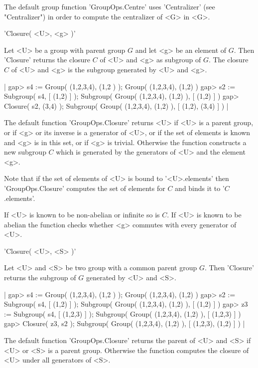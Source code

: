 The default   group function   'GroupOps.Centre' uses  'Centralizer' (see
"Centralizer") in order to compute the centralizer of <G> in <G>.


'Closure( <U>, <g> )'

Let <U> be  a group with  parent group $G$  and let <g> be an  element of
$G$. Then 'Closure' returns the closure $C$ of <U> and <g> as subgroup of
$G$. The closure $C$ of <U> and <g> is  the subgroup generated by <U> and
<g>.

|    gap> s4 := Group( (1,2,3,4), (1,2 ) );
    Group( (1,2,3,4), (1,2) )
    gap> s2 := Subgroup( s4, [ (1,2) ] );
    Subgroup( Group( (1,2,3,4), (1,2) ), [ (1,2) ] )
    gap> Closure( s2, (3,4) );
    Subgroup( Group( (1,2,3,4), (1,2) ), [ (1,2), (3,4) ] ) |

The default function 'GroupOps.Closure'  returns <U> if <U> is  a  parent
group, or if <g> or its inverse  is a generator of  <U>, or if the set of
elements  is  known  and  <g>  is in  this  set,  or  if <g>  is trivial.
Otherwise the function constructs a  new subgroup $C$  which is generated
by the generators of <U> and the element <g>.

Note  that if the set of elements of <U> is bound to '<U>.elements'  then
'GroupOps.Closure'  computes the set of elements  for $C$ and binds it to
'$C$.elements'.

If <U> is known to be non-abelian or infinite so is $C$.  If <U> is known
to be  abelian  the  function  checks  whether  <g>  commutes  with every
generator of <U>.

'Closure( <U>, <S> )'

Let <U> and <S> be  two  group with a   common parent  group   $G$.  Then
'Closure' returns the subgroup of $G$ generated by <U> and <S>.

|    gap> s4 := Group( (1,2,3,4), (1,2 ) );
    Group( (1,2,3,4), (1,2) )
    gap> s2 := Subgroup( s4, [ (1,2) ] );
    Subgroup( Group( (1,2,3,4), (1,2) ), [ (1,2) ] )
    gap> z3 := Subgroup( s4, [ (1,2,3) ] );
    Subgroup( Group( (1,2,3,4), (1,2) ), [ (1,2,3) ] )
    gap> Closure( z3, s2 );
    Subgroup( Group( (1,2,3,4), (1,2) ), [ (1,2,3), (1,2) ] ) |

The default function 'GroupOps.Closure' returns the parent of <U> and <S>
if <U> or <S> is  a  parent group. Otherwise  the  function computes  the
closure of <U> under all generators of <S>.

